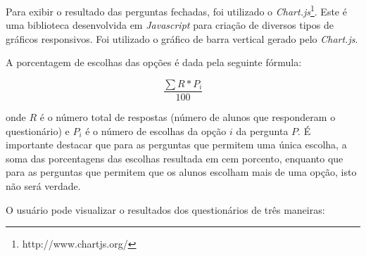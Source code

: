 \documentclass[
  12pt,       %
  openright,      %
  oneside,      %
  a4paper,      %
  english,      %
  french,        %
  spanish,     %
  brazil        %
  ]{abntex2-decsi}
\begin{document}
            Para exibir o resultado das perguntas fechadas, foi utilizado o \textit{Chart.js}\footnote{http://www.chartjs.org/}. Este é uma biblioteca desenvolvida em \textit{Javascript} para criação de diversos tipos de gráficos responsivos. Foi utilizado o gráfico de barra vertical gerado pelo \textit{Chart.js}. 

			A porcentagem de escolhas das opções é dada pela seguinte fórmula: 
            
            $$\frac{\sum R * P_{i}}{100}$$
            
            onde $R$ é o número total de respostas (número de alunos que responderam o questionário) e $P_{i}$ é o número de escolhas da opção $i$ da pergunta $P$. É importante destacar que para as perguntas que permitem uma única escolha, a soma das porcentagens das escolhas resultada em cem porcento, enquanto que para as perguntas que permitem que os alunos escolham mais de uma opção, isto não será verdade.
            
            O usuário pode visualizar o resultados dos questionários de três maneiras:
\end{document}
